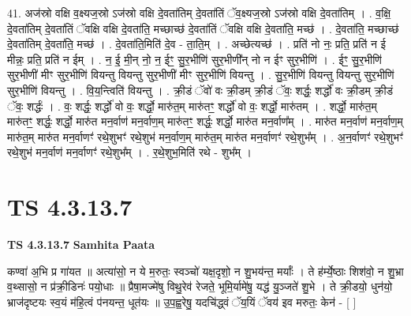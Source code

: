 \documentclass[17pt]{extarticle}
\begin{document}
41. अज॑स्रो वक्षि व॒क्ष्यज॒स्रो ऽज॑स्रो वक्षि दे॒वता॑तिम् दे॒वता॑तिं ॅव॒क्ष्यज॒स्रो ऽज॑स्रो वक्षि दे॒वता॑तिम् । . व॒क्षि॒ दे॒वता॑तिम् दे॒वता॑तिं ॅवक्षि वक्षि दे॒वता॑ति॒ मच्छाच्छ॑ दे॒वता॑तिं ॅवक्षि वक्षि दे॒वता॑ति॒ मच्छ॑ । . दे॒वता॑ति॒ मच्छाच्छ॑ दे॒वता॑तिम् दे॒वता॑ति॒ मच्छ॑ । . दे॒वता॑ति॒मिति॑ दे॒व - ता॒ति॒म् । . अच्छेत्यच्छ॑ । . प्रति॑ नो नः॒ प्रति॒ प्रति॑ न ई मीन्नः॒ प्रति॒ प्रति॑ न ईम् । . न॒ ई॒ मी॒न् नो॒ न॒ ईꣳ॒॒ सु॒र॒भीणि॑ सुर॒भीणी᳚न् नो न ईꣳ सुर॒भीणि॑ । . ईꣳ॒॒ सु॒र॒भीणि॑ सुर॒भीणी॑ मीꣳ सुर॒भीणि॑ वियन्तु वियन्तु सुर॒भीणी॑ मीꣳ सुर॒भीणि॑ वियन्तु । . सु॒र॒भीणि॑ वियन्तु वियन्तु सुर॒भीणि॑ सुर॒भीणि॑ वियन्तु । . वि॒य॒न्त्विति॑ वियन्तु । . क्री॒डं ॅवो॑ वः क्री॒डम् क्री॒डं ॅवः॒ शर्द्धः॒ शर्द्धो॑ वः क्री॒डम् क्री॒डं ॅवः॒ शर्द्धः॑ । . वः॒ शर्द्धः॒ शर्द्धो॑ वो वः॒ शर्द्धो॒ मारु॑त॒म् मारु॑तꣳ॒॒ शर्द्धो॑ वो वः॒ शर्द्धो॒ मारु॑तम् । . शर्द्धो॒ मारु॑त॒म् मारु॑तꣳ॒॒ शर्द्धः॒ शर्द्धो॒ मारु॑त मन॒र्वाण॑ मन॒र्वाण॒म् मारु॑तꣳ॒॒ शर्द्धः॒ 
शर्द्धो॒ मारु॑त मन॒र्वाण᳚म् । . मारु॑त मन॒र्वाण॑ मन॒र्वाण॒म् मारु॑त॒म् मारु॑त मन॒र्वाणꣳ॑ रथे॒शुभꣳ॑ रथे॒शुभ॑ मन॒र्वाण॒म् 
मारु॑त॒म् मारु॑त मन॒र्वाणꣳ॑ रथे॒शुभ᳚म् । . अ॒न॒र्वाणꣳ॑ रथे॒शुभꣳ॑ रथे॒शुभ॑ मन॒र्वाण॑ मन॒र्वाणꣳ॑ रथे॒शुभ᳚म् । . र॒थे॒शुभ॒मिति॑ रथे - शुभ᳚म् । \newline
\pagebreak
{}

\section{ TS 4.3.13.7 }

\textbf{TS 4.3.13.7 } \newline
\textbf{Samhita Paata} \newline

कण्वा॑ अ॒भि प्र गा॑यत ॥ अत्या॑सो॒ न ये म॒रुतः॒ स्वञ्चो॑ यक्ष॒दृशो॒ न शु॒भय॑न्त॒ मर्याः᳚ । ते ह॑र्म्ये॒ष्ठाः शिश॑वो॒ न शु॒भ्रा व॒थ्सासो॒ न प्र॑क्री॒डिनः॑ पयो॒धाः ॥ प्रैषा॒मज्मे॑षु विथु॒रेव॑ रेजते॒ भूमि॒र्यामे॑षु॒ यद्ध॑ यु॒ञ्जते॑ शु॒भे । ते क्री॒डयो॒ धुन॑यो॒ भ्राज॑दृष्टयः स्व॒यं म॑हि॒त्वं प॑नयन्त॒ धूत॑यः ॥ उ॒प॒ह्व॒रेषु॒ यदचि॑द्ध्वं ॅय॒यिं ॅवय॑ इव मरुतः॒ केन॑ - [  ] \newline
\end{document}
